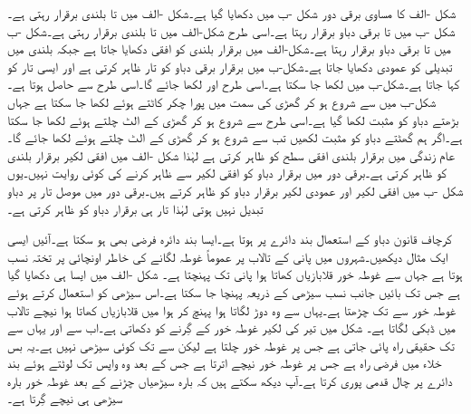 شکل -الف کا مساوی برقی دور شکل -ب میں دکھایا گیا ہے۔شکل -الف میں  تا  بلندی برقرار رہتی ہے۔شکل -ب میں  تا  برقی دباو برقرار رہتا ہے۔اسی طرح شکل-الف میں   تا  بلندی برقرار رہتی ہے۔شکل -ب میں  تا  برقی دباو برقرار رہتا ہے۔شکل-الف میں برقرار بلندی کو افقی دکھایا جاتا ہے جبکہ بلندی میں تبدیلی کو عمودی دکھایا جاتا ہے۔شکل-ب میں برقرار برقی دباو کو تار ظاہر کرتی ہے اور ایسی تار کو  کہا جاتا ہے۔شکل-ب میں  لکھا جا سکتا ہے۔اسی طرح  اور  لکھا جائے گا۔اسی طرح  سے  حاصل ہوتا ہے۔شکل-ب میں  سے شروع ہو کر گھڑی کی سمت میں پورا چکر کاٹتے ہوئے   لکھا جا سکتا ہے جہاں بڑھتے دباو کو مثبت لکھا گیا ہے۔اسی طرح  سے شروع ہو کر گھڑی کے الٹ چلتے ہوئے  لکھا جا سکتا ہے۔اگر ہم گھٹتے دباو کو مثبت لکھیں تب   سے شروع ہو کر گھڑی کے الٹ چلتے ہوئے  لکھا جائے گا۔عام زندگی میں برقرار بلندی افقی سطح کو ظاہر کرتی ہے لہٰذا شکل -الف میں افقی لکیر برقرار بلندی کو ظاہر کرتی ہے۔برقی دور میں برقرار دباو کو افقی لکیر سے ظاہر کرنے کی کوئی روایت نہیں۔یوں شکل -ب میں افقی لکیر  اور عمودی لکیر  برقرار دباو کو ظاہر کرتے ہیں۔برقی دور میں موصل تار پر  دباو تبدیل نہیں ہوتی لہٰذا تار ہی برقرار دباو کو ظاہر کرتی ہے۔

کرچاف قانون دباو کے استعمال بند دائرے پر ہوتا ہے۔ایسا بند دائرہ فرضی بھی ہو سکتا ہے۔آئیں ایسی ایک مثال دیکھیں۔شہروں میں پانی کے تالاب  پر عموماً غوطہ لگانے کی خاطر اونچائی پر تختہ نسب ہوتا ہے جہاں سے غوطہ خور قلابازیاں کھاتا ہوا پانی تک پہنچتا ہے۔ شکل -الف میں ایسا ہی  دکھایا گیا ہے جس تک بائیں جانب نسب سیڑھی کے ذریعہ پہنچا جا سکتا ہے۔اس سیڑھی کو استعمال کرتے ہوئے غوطہ خور  سے  تک چڑھتا ہے۔یہاں سے وہ دوڑ لگاتا ہوا  پہنچ کر ہوا میں قلابازیاں کھاتا ہوا نیچے تالاب میں ڈبکی لگاتا ہے۔ شکل میں تیر کی لکیر غوطہ خور کے گِرنے کو دکھاتی ہے۔اب  سے  اور یہاں سے  تک حقیقی راہ پائی جاتی ہے جس پر غوطہ خور چلتا ہے لیکن  سے  تک کوئی سیڑھی نہیں ہے۔یہ بس خلاء میں فرضی راہ ہے جس پر غوطہ خور نیچے اترتا ہے جس کے بعد وہ واپس  تک لوٹتے ہوئے بند دائرے پر چال قدمی پوری کرتا ہے۔آپ دیکھ سکتے ہیں کہ بارہ سیڑھیاں چڑنے کے بعد غوطہ خور بارہ سیڑھی ہی نیچے گِرتا ہے۔

